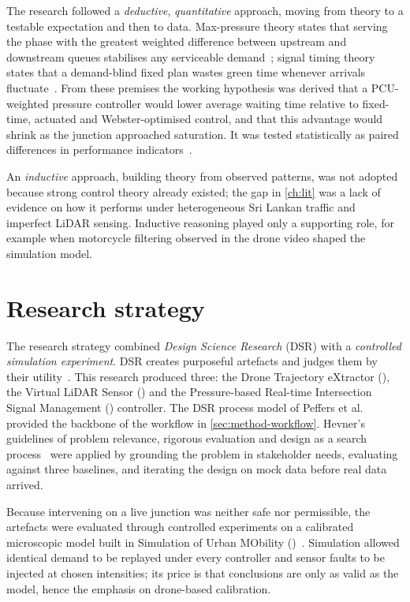 The research followed a \emph{deductive}, \emph{quantitative} approach, moving from theory to a testable expectation and then to data. Max-pressure theory states that serving the phase with the greatest weighted difference between upstream and downstream queues stabilises any serviceable demand~\cite{varaiya2013maxpressure}; signal timing theory states that a demand-blind fixed plan wastes green time whenever arrivals fluctuate~\cite{webster1958}. From these premises the working hypothesis was derived that a PCU-weighted pressure controller would lower average waiting time relative to fixed-time, actuated and Webster-optimised control, and that this advantage would shrink as the junction approached saturation. It was tested statistically as paired differences in performance indicators~\cite{wilcoxon1945}.

An \emph{inductive} approach, building theory from observed patterns, was not adopted because strong control theory already existed; the gap in \cref{ch:lit} was a lack of evidence on how it performs under heterogeneous Sri Lankan traffic and imperfect LiDAR sensing. Inductive reasoning played only a supporting role, for example when motorcycle filtering observed in the drone video shaped the simulation model.

\section{Research strategy}\label{sec:method-strategy}

The research strategy combined \emph{Design Science Research} (DSR) with a \emph{controlled simulation experiment}. DSR creates purposeful artefacts and judges them by their utility~\cite{hevner2004design}. This research produced three: the Drone Trajectory eXtractor (\dtx{}), the Virtual LiDAR Sensor (\vls{}) and the Pressure-based Real-time Intersection Signal Management (\prism{}) controller. The DSR process model of Peffers et al.~\cite{peffers2007dsrm} provided the backbone of the workflow in \cref{sec:method-workflow}. Hevner's guidelines of problem relevance, rigorous evaluation and design as a search process~\cite{hevner2004design} were applied by grounding the problem in stakeholder needs, evaluating against three baselines, and iterating the design on mock data before real data arrived.

Because intervening on a live junction was neither safe nor permissible, the artefacts were evaluated through controlled experiments on a calibrated microscopic model built in Simulation of Urban MObility (\sumo{})~\cite{lopez2018sumo,dowling2004toolbox}. Simulation allowed identical demand to be replayed under every controller and sensor faults to be injected at chosen intensities; its price is that conclusions are only as valid as the model, hence the emphasis on drone-based calibration.


